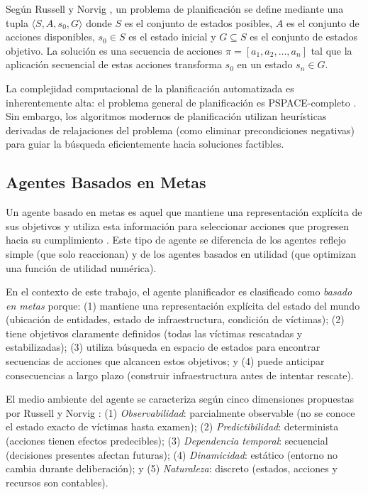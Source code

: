 \documentclass[conference]{IEEEtran}
\begin{document}
    Según Russell y Norvig \cite{russell2020aima}, un problema de planificación se define mediante una tupla $\langle S, A, s_0, G \rangle$ donde $S$ es el conjunto de estados posibles, $A$ es el conjunto de acciones disponibles, $s_0 \in S$ es el estado inicial y $G \subseteq S$ es el conjunto de estados objetivo. La solución es una secuencia de acciones $\pi = [a_1, a_2, \ldots, a_n]$ tal que la aplicación secuencial de estas acciones transforma $s_0$ en un estado $s_n \in G$.

    La complejidad computacional de la planificación automatizada es inherentemente alta: el problema general de planificación es PSPACE-completo \cite{ghallab2004automated}. Sin embargo, los algoritmos modernos de planificación utilizan heurísticas derivadas de relajaciones del problema (como eliminar precondiciones negativas) para guiar la búsqueda eficientemente hacia soluciones factibles.

    \subsection{Agentes Basados en Metas}

    Un agente basado en metas es aquel que mantiene una representación explícita de sus objetivos y utiliza esta información para seleccionar acciones que progresen hacia su cumplimiento \cite{russell2020aima}. Este tipo de agente se diferencia de los agentes reflejo simple (que solo reaccionan) y de los agentes basados en utilidad (que optimizan una función de utilidad numérica).

    En el contexto de este trabajo, el agente planificador es clasificado como \textit{basado en metas} porque: (1) mantiene una representación explícita del estado del mundo (ubicación de entidades, estado de infraestructura, condición de víctimas); (2) tiene objetivos claramente definidos (todas las víctimas rescatadas y estabilizadas); (3) utiliza búsqueda en espacio de estados para encontrar secuencias de acciones que alcancen estos objetivos; y (4) puede anticipar consecuencias a largo plazo (construir infraestructura antes de intentar rescate).

    El medio ambiente del agente se caracteriza según cinco dimensiones propuestas por Russell y Norvig \cite{russell2020aima}: (1) \textit{Observabilidad}: parcialmente observable (no se conoce el estado exacto de víctimas hasta examen); (2) \textit{Predictibilidad}: determinista (acciones tienen efectos predecibles); (3) \textit{Dependencia temporal}: secuencial (decisiones presentes afectan futuras); (4) \textit{Dinamicidad}: estático (entorno no cambia durante deliberación); y (5) \textit{Naturaleza}: discreto (estados, acciones y recursos son contables).
\end{document}
